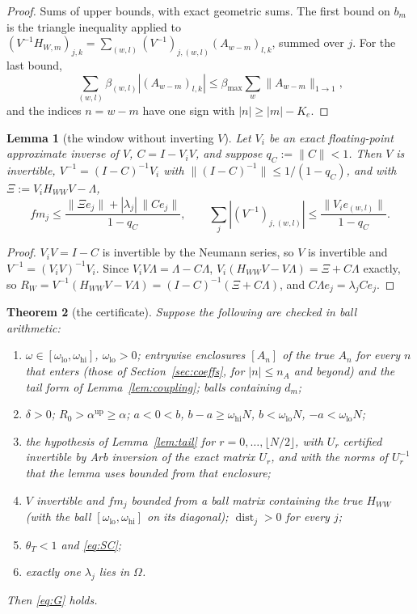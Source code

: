 \documentclass[11pt]{article}
\newtheorem{lemma}{Lemma}[section]
\newtheorem{thmx}[lemma]{Theorem}
\theoremstyle{definition}
\begin{document}
\begin{proof}
Sums of upper bounds, with exact geometric sums. The first bound on $b_m$ is the triangle inequality applied to $(V^{-1}H_{W,m})_{j,k} = \sum_{(w,l)}(V^{-1})_{j,(w,l)}(A_{w-m})_{l,k}$, summed over $j$. For the last bound,
\[
\sum_{(w,l)}\beta_{(w,l)}|(A_{w-m})_{l,k}| \le \beta_{\max}\sum_w\|A_{w-m}\|_{1\to1},
\]
and the indices $n = w - m$ have one sign with $|n| \ge |m| - K_e$.
\end{proof}

\begin{lemma}[the window without inverting $V$]\label{lem:Vinv}
Let $V_i$ be an exact floating-point approximate inverse of $V$, $C = I - V_iV$, and suppose $q_C := \|C\| < 1$. Then $V$ is invertible, $V^{-1} = (I - C)^{-1}V_i$ with $\|(I - C)^{-1}\| \le 1/(1 - q_C)$, and with $\Xi := V_iH_{WW}V - \Lambda$,
\[ f\!m_j \le \frac{\|\Xi e_j\| + |\lambda_j|\,\|Ce_j\|}{1 - q_C}, \qquad \sum_j|(V^{-1})_{j,(w,l)}| \le \frac{\|V_ie_{(w,l)}\|}{1 - q_C}. \]
\end{lemma}

\begin{proof}
$V_iV = I - C$ is invertible by the Neumann series, so $V$ is invertible and $V^{-1} = (V_iV)^{-1}V_i$. Since $V_iV\Lambda = \Lambda - C\Lambda$, $V_i(H_{WW}V - V\Lambda) = \Xi + C\Lambda$ exactly, so $R_W = V^{-1}(H_{WW}V - V\Lambda) = (I - C)^{-1}(\Xi + C\Lambda)$, and $C\Lambda e_j = \lambda_jCe_j$.
\end{proof}

\begin{thmx}[the certificate]\label{thm:cert}
Suppose the following are checked in ball arithmetic:
\begin{enumerate}
\item[(C0)] $\omega \in [\omega_{\mathrm{lo}}, \omega_{\mathrm{hi}}]$, $\omega_{\mathrm{lo}} > 0$; entrywise enclosures $[A_n]$ of the true $A_n$ for every $n$ that enters (those of Section~\ref{sec:coeffs}, for $|n| \le n_A$ and beyond) and the tail form of Lemma~\ref{lem:coupling}; balls containing $d_m$;
\item[(C1)] $\delta > 0$; $R_0 > \alpha^{\mathrm{up}} \ge \alpha$; $a < 0 < b$, $b - a \ge \omega_{\mathrm{hi}}N$, $b < \omega_{\mathrm{lo}}N$, $-a < \omega_{\mathrm{lo}}N$;
\item[(C2)] the hypothesis of Lemma~\ref{lem:tail} for $r = 0, \dots, \lfloor N/2\rfloor$, with $U_r$ certified invertible by Arb inversion of the exact matrix $U_r$, and with the norms of $U_r^{-1}$ that the lemma uses bounded from that enclosure;
\item[(C3)] $V$ invertible and $f\!m_j$ bounded from a ball matrix containing the true $H_{WW}$ (with the ball $[\omega_{\mathrm{lo}}, \omega_{\mathrm{hi}}]$ on its diagonal); $\operatorname{dist}_j > 0$ for every $j$;
\item[(C4)] $\theta_T < 1$ and \eqref{eq:SC};
\item[(C5)] exactly one $\lambda_j$ lies in $\Omega$.
\end{enumerate}
Then \eqref{eq:G} holds.
\end{thmx}
\end{document}
